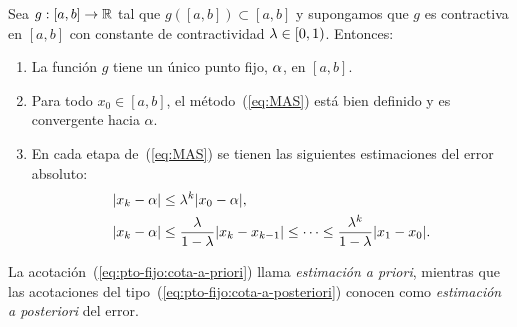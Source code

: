 \begin{theorem}
  \label{thm:punto-fijo-Banach}
  Sea $g:[a,b]\to\operatorname{{\mathbb R}}$ tal que $g([a,b]) \subset [a,b]$ y supongamos
  que $g$ es contractiva en $[a,b]$ con constante de contractividad
  $\lambda\in [0,1)$. Entonces:
  \begin{enumerate}
  \item
    \label{item:punto-fijo-Banach:1}
    La función $g$ tiene un \textsf{único punto fijo}, $\alpha$, en
    $[a,b]$.
  \item
    \label{item:punto-fijo-Banach:2}
    Para todo $x_0\in [a,b]$, el método~(\ref{eq:MAS}) está bien
    definido y es \textsf{convergente} hacia $\alpha$.
  \item En cada etapa de~(\ref{eq:MAS}) se tienen las siguientes
    \textsf{estimaciones} del error absoluto:
    \label{item:punto-fijo-Banach:3}
    \begin{align}
      \label{eq:pto-fijo:cota-a-priori}
      |x_k-\alpha| &\le \lambda^k |x_0-\alpha|,
      \\
      \label{eq:pto-fijo:cota-a-posteriori}
      |x_k-\alpha| &\le \frac{\lambda}{1-\lambda}
                    |x_k-x_{k-1}| \le \dots \le
                    \frac{\lambda^k}{1-\lambda}
                    |x_1-x_0|.
    \end{align}
  \end{enumerate}
\end{theorem}

La acotación~(\ref{eq:pto-fijo:cota-a-priori}) llama
\textit{estimación a priori}, mientras que
las acotaciones del tipo~(\ref{eq:pto-fijo:cota-a-posteriori}) conocen como
\textit{estimación a posteriori} del error.

